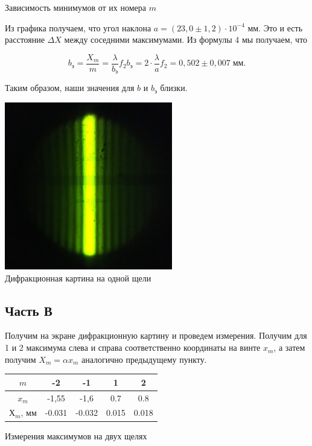 \documentclass[a4paper, 12pt]{article}%
\begin{document}
\begin{center}
Зависимость минимумов от их номера $ m $
\end{center}

Из графика получаем, что угол наклона $ a = (23,0 \pm 1,2) \cdot 10^{-4} $ мм. Это и есть расстояние $ \Delta X $ между соседними максимумами. Из формулы 4 мы получаем, что 

\begin{equation}
b_{\text{э}}= \frac{X_m}{m} = \dfrac{\lambda}{b_{\text{э}}} f_2 b_{\text{э}} = 2 \cdot \dfrac{\lambda}{a} f_2 = 0,502 \pm 0,007 \; мм. 
\end{equation}

Таким образом, наши значения для $ b $ и $ b_{\text{э}} $ близки. 
\
  \begin{center}
    \includegraphics[width = 0.55\textwidth]{pics/7.png}\\
    
    Дифракционная картина на одной щели
  \end{center}
  
  
\newpage
\subsection*{Часть В}

Получим на экране дифракционную картину и проведем измерения. Получим для 1 и 2 максимума слева и справа соответственно координаты на винте $ x_m $, а затем получим $ X_m = \alpha x_m $ аналогично предыдущему пункту. 

\begin{center}	
\begin{tabular}{|c|c|c|c|c|}
	\hline 
	$m$ & -2 & -1 & 1 & 2 \\ 
	\hline 
	$x_m$ & -1,55 & -1,6 & 0.7 & 0.8 \\ 
	\hline 
	$Х_m$, мм & -0.031 & -0.032 & 0.015 & 0.018 \\ 
	\hline 
\end{tabular}   

\begin{center}
Измерения максимумов на двух щелях\
\end{center}

\end{center}
\end{document}
